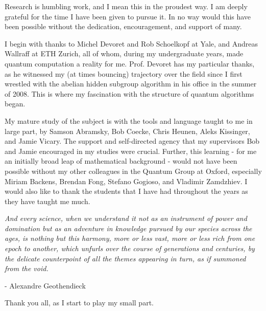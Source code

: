 \begin{acknowledgements}
Research is humbling work, and I mean this in the proudest way. I am deeply grateful for the time I have been given to pursue it.  In no way would this have been possible without the dedication, encouragement, and support of many.

I begin with thanks to Michel Devoret and Rob Schoelkopf at Yale, and Andreas Wallraff at ETH Zurich, all of whom, during my undergraduate years, made quantum computation a reality for me.  Prof. Devoret has my particular thanks, as he witnessed my (at times bouncing) trajectory over the field since I first wrestled with the abelian hidden subgroup algorithm in his office in the summer of 2008. This is where my fascination with the structure of quantum algorithms began.

My mature study of the subject is with the tools and language taught to me in large part, by Samson Abramsky, Bob Coecke, Chris Heunen, Aleks Kissinger, and Jamie Vicary. The support and self-directed agency that my supervisors Bob and Jamie encouraged in my studies were crucial. Further, this learning - for me an initially broad leap of mathematical background - would not have been possible without my other colleagues in the Quantum Group at Oxford, especially Miriam Backens, Brendan Fong, Stefano Gogioso, and Vladimir Zamdzhiev. I would also like to thank the students that I have had throughout the years as they have taught me much. 

\textit{And every science, when we understand it not as an instrument of power and domination but as an adventure in knowledge pursued by our species across the ages, is nothing but this harmony, more or less vast, more or less rich from one epoch to another, which unfurls over the course of generations and centuries, by the delicate counterpoint of all the themes appearing in turn, as if summoned from the void.}

\hspace{230pt} - Alexandre Geothendieck

Thank you all, as I start to play my small part.

\end{acknowledgements}
